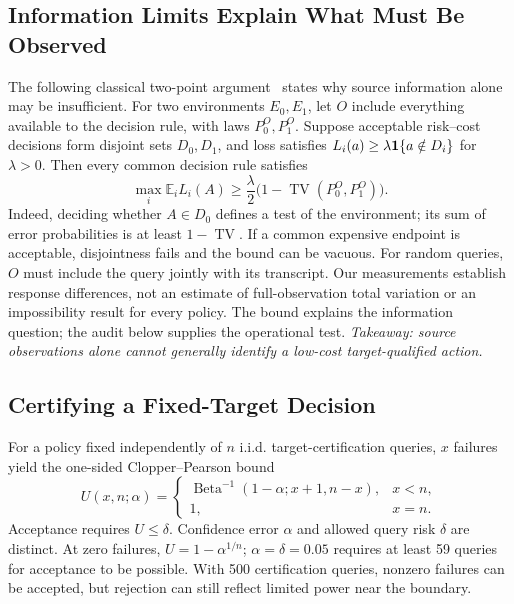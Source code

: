 \subsection{Information Limits Explain What Must Be Observed}
\label{sec:information-limit}
The following classical two-point argument~\cite{yu1997assouad} states why source information alone may be insufficient. For two environments $E_0,E_1$, let $O$ include everything available to the decision rule, with laws $P_0^O,P_1^O$. Suppose acceptable risk--cost decisions form disjoint sets $D_0,D_1$, and loss satisfies $L_i(a)\ge\lambda\mathbf{1}\{a\notin D_i\}$ for $\lambda>0$. Then every common decision rule satisfies
\begin{equation}
 \max_i\mathbb E_i L_i(A)\ge\frac{\lambda}{2}\bigl(1-\operatorname{TV}(P_0^O,P_1^O)\bigr).\label{eq:information}
\end{equation}
Indeed, deciding whether $A\in D_0$ defines a test of the environment; its sum of error probabilities is at least $1-\operatorname{TV}$. If a common expensive endpoint is acceptable, disjointness fails and the bound can be vacuous. For random queries, $O$ must include the query jointly with its transcript. Our measurements establish response differences, not an estimate of full-observation total variation or an impossibility result for every policy. The bound explains the information question; the audit below supplies the operational test. \emph{Takeaway: source observations alone cannot generally identify a low-cost target-qualified action.}

\subsection{Certifying a Fixed-Target Decision}
\label{sec:fixed-cert}
For a policy fixed independently of $n$ i.i.d. target-certification queries, $x$ failures yield the one-sided Clopper--Pearson bound~\cite{clopper1934confidence}
\begin{equation}
 U(x,n;\alpha)=\begin{cases}
 \operatorname{Beta}^{-1}(1-\alpha;x+1,n-x),&x<n,\\1,&x=n.
 \end{cases}\label{eq:cp}
\end{equation}
Acceptance requires $U\le\delta$. Confidence error $\alpha$ and allowed query risk $\delta$ are distinct. At zero failures, $U=1-\alpha^{1/n}$; $\alpha=\delta=0.05$ requires at least 59 queries for acceptance to be possible. With 500 certification queries, nonzero failures can be accepted, but rejection can still reflect limited power near the boundary.

